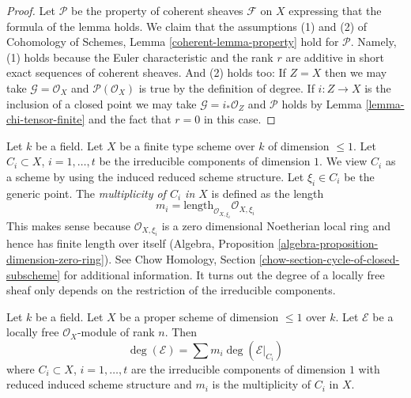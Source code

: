 \begin{proof}
Let $\mathcal{P}$ be the property of coherent sheaves $\mathcal{F}$
on $X$ expressing that the formula of the lemma holds. We claim that
the assumptions (1) and (2) of
Cohomology of Schemes, Lemma \ref{coherent-lemma-property}
hold for $\mathcal{P}$. Namely, (1) holds because the Euler characteristic
and the rank $r$ are additive in short exact sequences of coherent sheaves.
And (2) holds too: If $Z = X$ then we may take
$\mathcal{G} = \mathcal{O}_X$ and $\mathcal{P}(\mathcal{O}_X)$
is true by the definition of degree. If $i : Z \to X$ is the inclusion
of a closed point we may take $\mathcal{G} = i_*\mathcal{O}_Z$
and $\mathcal{P}$ holds by Lemma \ref{lemma-chi-tensor-finite}
and the fact that $r = 0$ in this case.
\end{proof}

\noindent
Let $k$ be a field. Let $X$ be a finite type scheme over $k$ of
dimension $\leq 1$. Let $C_i \subset X$, $i = 1, \ldots, t$ be
the irreducible components of dimension $1$. We view $C_i$ as a scheme
by using the induced reduced scheme structure. Let $\xi_i \in C_i$ be the
generic point. The {\it multiplicity of $C_i$ in $X$} is defined
as the length
$$
m_i = \text{length}_{\mathcal{O}_{X, \xi_i}} \mathcal{O}_{X, \xi_i}
$$
This makes sense because $\mathcal{O}_{X, \xi_i}$ is a zero dimensional
Noetherian local ring and hence has finite length over itself
(Algebra, Proposition \ref{algebra-proposition-dimension-zero-ring}).
See Chow Homology, Section \ref{chow-section-cycle-of-closed-subscheme}
for additional information. It turns out the degree of a locally free
sheaf only depends on the restriction of the irreducible components.

\begin{lemma}
\label{lemma-degree-in-terms-of-components}
Let $k$ be a field. Let $X$ be a proper scheme of dimension $\leq 1$ over $k$.
Let $\mathcal{E}$ be a locally free $\mathcal{O}_X$-module of rank $n$.
Then
$$
\deg(\mathcal{E}) = \sum m_i \deg(\mathcal{E}|_{C_i})
$$
where $C_i \subset X$, $i = 1, \ldots, t$ are the irreducible components
of dimension $1$ with reduced induced scheme structure and $m_i$ is the
multiplicity of $C_i$ in $X$.
\end{lemma}

